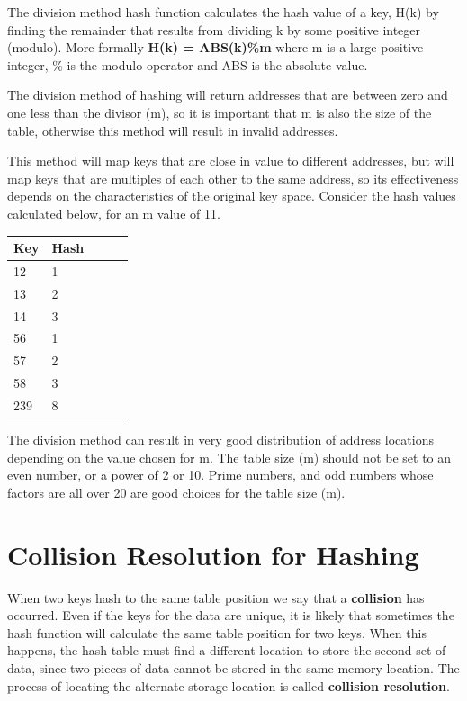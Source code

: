 The division method hash function calculates the hash value of a key, H(k) by finding the remainder that results from dividing k by some positive integer (modulo). More formally \textbf{H(k) = ABS(k)\%m} where m is a large positive integer, \% is the modulo operator and ABS is the absolute value.

 The division method of hashing will return addresses that are between zero and one less than the divisor (m), so it is important that m is also the size of the table, otherwise this method will result in invalid addresses.


 This method will map keys that are close in value to different addresses, but will map keys that are multiples of each other to the same address, so its effectiveness depends on the characteristics of the original key space. Consider the hash values calculated below, for an m value of 11.
   


\begin{tabular}{lllll}
\hline
Key & Hash  \\ \hline
12  & 1     \\
13  & 2     \\
14  & 3     \\ \hline
56  & 1     \\
57  & 2     \\
58  & 3     \\
239 & 8    
\end{tabular}

The division method can result in very good distribution of address locations depending on the value chosen for m.  The table size (m) should not be set to an even number, or a power of 2 or 10.   Prime numbers, and odd numbers  whose factors are all over 20 are good choices for the table size (m).
   

\section{Collision Resolution for Hashing}

When two keys hash to the same table position we say that a \textbf{collision} has occurred.  Even if the keys for the data are unique, it is likely that sometimes the hash function will calculate the same table position for two keys.   When  this happens, the hash table must find a different location to store the second set of data, since two pieces of data cannot be stored in the same memory location.   The process of locating the alternate storage location is called \textbf{collision resolution}.
   
